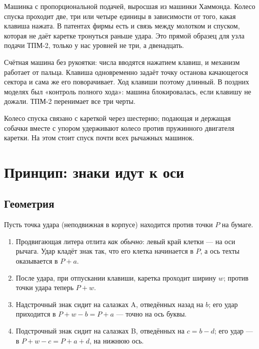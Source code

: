 \begin{description}[style=nextline,leftmargin=0pt]
  \item[Varityper (Hammond), 1930-е.] Машинка с пропорциональной подачей, выросшая из машинки Хаммонда. Колесо спуска проходит две, три или четыре единицы в зависимости от того, какая клавиша нажата. В патентах фирмы есть и связь между молотком и спуском, которая не даёт каретке тронуться раньше удара. Это прямой образец для узла подачи ТПМ-2, только у нас уровней не три, а двенадцать.
  \item[Комптометр, 1887.] Счётная машина без рукоятки: числа вводятся нажатием клавиш, и механизм работает от пальца. Клавиша одновременно задаёт точку останова качающегося сектора и сама же его поворачивает. Ход клавиши поэтому длинный. В поздних моделях был «контроль полного хода»: машина блокировалась, если клавишу не дожали. ТПМ-2 перенимает все три черты.
  \item[Двухсобачечный спуск.] Колесо спуска связано с кареткой через шестерню; подающая и держащая собачки вместе с упором удерживают колесо против пружинного двигателя каретки. На этом стоит спуск почти всех рычажных машинок.
\end{description}

\section{Принцип: знаки идут к оси}

\subsection{Геометрия}

Пусть точка удара (неподвижная в корпусе) находится против точки $P$ на бумаге.

\begin{enumerate}
  \item Продвигающая литера отлита \emph{как обычно}: левый край клетки — на оси рычага. Удар кладёт знак так, что его клетка начинается в $P$, а ось техты оказывается в $P + a$.
  \item После удара, при отпускании клавиши, каретка проходит ширину $w$; против точки удара теперь $P + w$.
  \item Надстрочный знак сидит на салазках A, отведённых назад на $b$; его удар приходится в $P + w - b = P + a$ — точно на ось буквы.
  \item Подстрочный знак сидит на салазках B, отведённых на $c = b - d$; его удар — в $P + w - c = P + a + d$, на нижнюю ось.
\end{enumerate}

